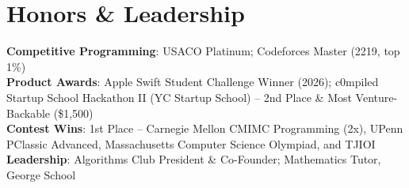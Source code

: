 \documentclass[letterpaper,11pt]{article}
\begin{document}
\section{Honors \& Leadership}
 \begin{itemize}[leftmargin=0.15in, label={}]
    \small{\item{
      \textbf{Competitive Programming}{: USACO Platinum; Codeforces Master (2219, top 1\%)} \\
      \textbf{Product Awards}{: Apple Swift Student Challenge Winner (2026); c0mpiled Startup School Hackathon II (YC Startup School) -- 2nd Place \& Most Venture-Backable (\$1,500)} \\
      \textbf{Contest Wins}{: 1st Place -- Carnegie Mellon CMIMC Programming (2x), UPenn PClassic Advanced, Massachusetts Computer Science Olympiad, and TJIOI} \\
      \textbf{Leadership}{: Algorithms Club President \& Co-Founder; Mathematics Tutor, George School}
    }}
 \end{itemize}
\end{document}
